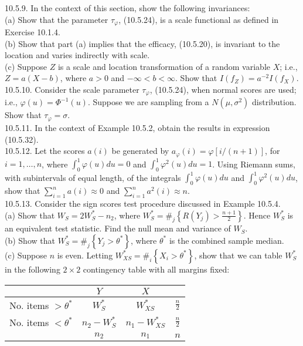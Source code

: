 10.5.9. In the context of this section, show the following invariances:\\
(a) Show that the parameter $\tau_{\varphi}$, (10.5.24), is a scale functional as defined in Exercise 10.1.4.\\
(b) Show that part (a) implies that the efficacy, (10.5.20), is invariant to the location and varies indirectly with scale.\\
(c) Suppose $Z$ is a scale and location transformation of a random variable $X$; i.e., $Z=a(X-b)$, where $a>0$ and $-\infty<b<\infty$. Show that $I\left(f_{Z}\right)=a^{-2} I\left(f_{X}\right)$.\\
10.5.10. Consider the scale parameter $\tau_{\varphi}$, (10.5.24), when normal scores are used; i.e., $\varphi(u)=\Phi^{-1}(u)$. Suppose we are sampling from a $N\left(\mu, \sigma^{2}\right)$ distribution. Show that $\tau_{\varphi}=\sigma$.\\
10.5.11. In the context of Example 10.5.2, obtain the results in expression (10.5.32).\\
10.5.12. Let the scores $a(i)$ be generated by $a_{\varphi}(i)=\varphi[i /(n+1)]$, for $i=1, \ldots, n$, where $\int_{0}^{1} \varphi(u) d u=0$ and $\int_{0}^{1} \varphi^{2}(u) d u=1$. Using Riemann sums, with subintervals of equal length, of the integrals $\int_{0}^{1} \varphi(u) d u$ and $\int_{0}^{1} \varphi^{2}(u) d u$, show that $\sum_{i=1}^{n} a(i) \approx 0$ and $\sum_{i=1}^{n} a^{2}(i) \approx n$.\\
10.5.13. Consider the sign scores test procedure discussed in Example 10.5.4.\\
(a) Show that $W_{S}=2 W_{S}^{*}-n_{2}$, where $W_{S}^{*}=\#_{j}\left\{R\left(Y_{j}\right)>\frac{n+1}{2}\right\}$. Hence $W_{S}^{*}$ is an equivalent test statistic. Find the null mean and variance of $W_{S}$.\\
(b) Show that $W_{S}^{*}=\#_{j}\left\{Y_{j}>\theta^{*}\right\}$, where $\theta^{*}$ is the combined sample median.\\
(c) Suppose $n$ is even. Letting $W_{X S}^{*}=\#_{i}\left\{X_{i}>\theta^{*}\right\}$, show that we can table $W_{S}^{*}$ in the following $2 \times 2$ contingency table with all margins fixed:

\begin{center}
\begin{tabular}{|c|c|c|c|}
\hline
 & $Y$ & $X$ &  \\
\hline
No. items $>\theta^{*}$ & $W_{S}^{*}$ & $W_{X S}^{*}$ & $\frac{n}{2}$ \\
\hline
No. items $<\theta^{*}$ & $n_{2}-W_{S}^{*}$ & $n_{1}-W_{X S}^{*}$ & $\frac{n}{2}$ \\
\hline
 & $n_{2}$ & $n_{1}$ & $n$ \\
\hline
\end{tabular}
\end{center}

